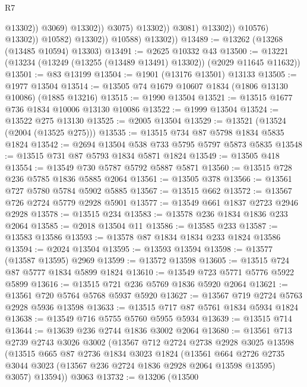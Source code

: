 \begin{lexlean}{R7}
\begin{coremodule}
                                            @13302))
                                        @3069)
                                      @13302))
                                  @3075)
                                @13302))
                            @3081)
                          @13302))
                      @10576)
                    @13302))
                @10582)
              @13302))
          @10588)
        @13302))
@13489 := @13262 (@13268 (@13485 @10594) @13303)
@13491 := @2625 @10332 @43
@13500 := @13221 (@13234 (@13249 (@13255 (@13489 @13491) @13302)) (@2029 @11645 @11632))
@13501 := @83 @13199
@13504 := @1901 (@13176 @13501) @13133
@13505 := @1977 @13504
@13514 := @13505 @74 @1679 @10607 @1834 (@1806 @13130 @10086) (@1885 @13216)
@13515 := @1990 @13504
@13521 := @13515 @1677 @736 @1834 @10006 @13130 @10086
@13522 := @1999 @13504
@13524 := @13522 @275 @13130
@13525 := @2005 @13504
@13529 := @13521 (@13524 (@2004 (@13525 @275)))
@13535 := @13515 @734 @87 @5798 @1834 @5835 @1824
@13542 := @2694 @13504 @538 @733 @5795 @5797 @5873 @5835
@13548 := @13515 @731 @87 @5793 @1834 @5871 @1824
@13549 := @13505 @418
@13554 := @13549 @730 @5787 @5792 @5887 @5871
@13560 := @13515 @728 @236 @5785 @1836 @5885 @2064
@13561 := @13505 @378
@13566 := @13561 @727 @5780 @5784 @5902 @5885
@13567 := @13515 @662
@13572 := @13567 @726 @2724 @5779 @2928 @5901
@13577 := @13549 @661 @1837 @2723 @2946 @2928
@13578 := @13515 @234
@13583 := @13578 @236 @1834 @1836 @233 @2064
@13585 := @2018 @13504 @11
@13586 := @13585 @233
@13587 := @13583 @13586
@13593 := @13578 @87 @1834 @1834 @233 @1824 @13586
@13594 := @2024 @13504
@13595 := @13593 @13594
@13598 := @13577 (@13587 @13595) @2969
@13599 := @13572 @13598
@13605 := @13515 @724 @87 @5777 @1834 @5899 @1824
@13610 := @13549 @723 @5771 @5776 @5922 @5899
@13616 := @13515 @721 @236 @5769 @1836 @5920 @2064
@13621 := @13561 @720 @5764 @5768 @5937 @5920
@13627 := @13567 @719 @2724 @5763 @2928 @5936 @13598
@13633 := @13515 @717 @87 @5761 @1834 @5934 @1824
@13638 := @13549 @716 @5755 @5760 @5955 @5934
@13639 := @13515 @714
@13644 := @13639 @236 @2744 @1836 @3002 @2064
@13680 := @13561
    @713
    @2739
    @2743
    @3026
    @3002
    (@13567
      @712
      @2724
      @2738
      @2928
      @3025
      @13598
      (@13515
        @665
        @87
        @2736
        @1834
        @3023
        @1824
        (@13561
          @664
          @2726
          @2735
          @3044
          @3023
          (@13567 @236 @2724 @1836 @2928 @2064 @13598 @13595)
          @3057)
        @13594))
    @3063
@13732 := @13206
    (@13500

\end{coremodule}
\end{lexlean}
